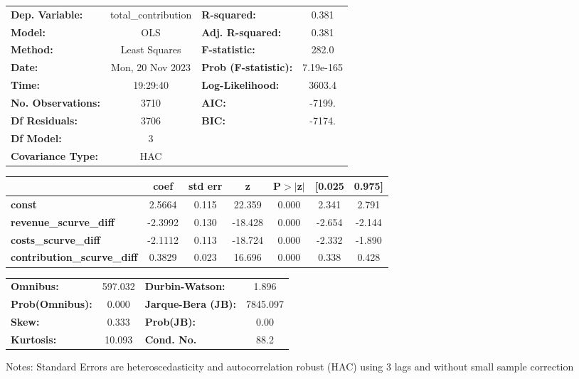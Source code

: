 \begin{center}
\begin{tabular}{lclc}
\toprule
\textbf{Dep. Variable:}             & total\_contribution & \textbf{  R-squared:         } &     0.381   \\
\textbf{Model:}                     &         OLS         & \textbf{  Adj. R-squared:    } &     0.381   \\
\textbf{Method:}                    &    Least Squares    & \textbf{  F-statistic:       } &     282.0   \\
\textbf{Date:}                      &   Mon, 20 Nov 2023  & \textbf{  Prob (F-statistic):} & 7.19e-165   \\
\textbf{Time:}                      &       19:29:40      & \textbf{  Log-Likelihood:    } &    3603.4   \\
\textbf{No. Observations:}          &          3710       & \textbf{  AIC:               } &    -7199.   \\
\textbf{Df Residuals:}              &          3706       & \textbf{  BIC:               } &    -7174.   \\
\textbf{Df Model:}                  &             3       & \textbf{                     } &             \\
\textbf{Covariance Type:}           &         HAC         & \textbf{                     } &             \\
\bottomrule
\end{tabular}
\begin{tabular}{lcccccc}
                                    & \textbf{coef} & \textbf{std err} & \textbf{z} & \textbf{P$> |$z$|$} & \textbf{[0.025} & \textbf{0.975]}  \\
\midrule
\textbf{const}                      &       2.5664  &        0.115     &    22.359  &         0.000        &        2.341    &        2.791     \\
\textbf{revenue\_scurve\_diff}      &      -2.3992  &        0.130     &   -18.428  &         0.000        &       -2.654    &       -2.144     \\
\textbf{costs\_scurve\_diff}        &      -2.1112  &        0.113     &   -18.724  &         0.000        &       -2.332    &       -1.890     \\
\textbf{contribution\_scurve\_diff} &       0.3829  &        0.023     &    16.696  &         0.000        &        0.338    &        0.428     \\
\bottomrule
\end{tabular}
\begin{tabular}{lclc}
\textbf{Omnibus:}       & 597.032 & \textbf{  Durbin-Watson:     } &    1.896  \\
\textbf{Prob(Omnibus):} &   0.000 & \textbf{  Jarque-Bera (JB):  } & 7845.097  \\
\textbf{Skew:}          &   0.333 & \textbf{  Prob(JB):          } &     0.00  \\
\textbf{Kurtosis:}      &  10.093 & \textbf{  Cond. No.          } &     88.2  \\
\bottomrule
\end{tabular}
\end{center}

Notes: \newline
 [1] Standard Errors are heteroscedasticity and autocorrelation robust (HAC) using 3 lags and without small sample correction